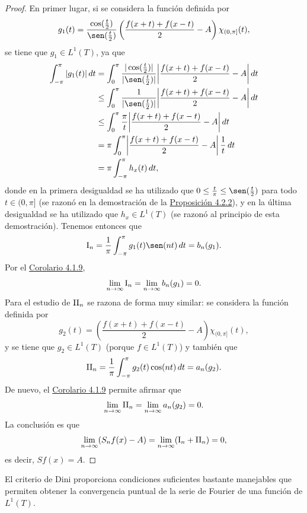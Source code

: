 \documentclass[a4paper, 11pt, oneside]{report}
\begin{document}
\begin{proof}
  En primer lugar, si se considera la función definida por 
  \[g_1(t) =\frac{\cos(\frac{t}{2})}{\sen(\frac{t}{2})} \left(\frac{f(x+t)+f(x-t)}{2}-A\right)\chi_{(0,\pi]}(t),\]
  se tiene que $g_1 \in L^1(T)$, ya que
  \[
  \begin{aligned}[t]
  \int_{-\pi}^\pi |g_1(t)| \, dt &= \int_0^\pi \frac{|\cos(\frac{t}{2})|}{|\sen(\frac{t}{2})|}\biggl|\frac{f(x+t)+f(x-t)}{2}-A\biggr| \, dt \\
  &\leq \int_0^\pi \frac{1}{|\sen(\frac{t}{2})|} \biggl|\frac{f(x+t)+f(x-t)}{2}-A\biggr| \, dt \\
  &\leq \int_0^\pi \frac{\pi}{t} \biggl|\frac{f(x+t)+f(x-t)}{2}-A\biggr| \, dt \\
  &= \pi \int_0^\pi \biggl|\frac{f(x+t)+f(x-t)}{2}-A\biggr| \, \frac{1}{t} \, dt \\
  &= \pi \int_{-\pi}^\pi h_x(t) \, dt,
  \end{aligned}
  \]
  donde en la primera desigualdad se ha utilizado que $0 \leq \frac{t}{\pi} \leq \sen(\frac{t}{2})$ para todo $t \in (0,\pi]$ (se razonó en la demostración de la \hyperref[pro:4.2.2]{\color{c1}Proposición 4.2.2}), y en la última desigualdad se ha utilizado que $h_x \in L^1(T)$ (se razonó al principio de esta demostración). Tenemos entonces que
  \[\textup{I}_n = \frac{1}{\pi}\int_{-\pi}^\pi g_1(t) \sen(nt) \, dt = b_n(g_1).\]
  Por el \hyperref[cor:4.1.9]{\color{c1}Corolario 4.1.9},
  \[\lim_{n \to \infty} \textup{I}_n = \lim_{n \to \infty} b_n(g_1) = 0.\]
  Para el estudio de $\textup{II}_n$ se razona de forma muy similar: se considera la función definida por
  \[g_2(t) = \left(\frac{f(x+t)+f(x-t)}{2}-A\right)\chi_{(0,\pi]}(t),\]
  y se tiene que $g_2 \in L^1(T)$ (porque $f \in L^1(T)$) y también que
  \[\textup{II}_n = \frac{1}{\pi}\int_{-\pi}^\pi g_2(t) \cos(nt) \, dt = a_n(g_2).\]
  De nuevo, el \hyperref[cor:4.1.9]{\color{c1}Corolario 4.1.9} permite afirmar que
  \[\lim_{n \to \infty} \textup{II}_n = \lim_{n \to \infty} a_n(g_2) = 0.\]
  La conclusión es que
  \[\lim_{n \to \infty} (S_nf(x) - A) = \lim_{n \to \infty}(\textup{I}_n+\textup{II}_n) = 0,\]
  es decir, $Sf(x)=A$.
\end{proof}

El criterio de Dini proporciona condiciones suficientes bastante manejables que permiten obtener la convergencia puntual de la serie de Fourier de una función de $L^1(T)$.
\end{document}
